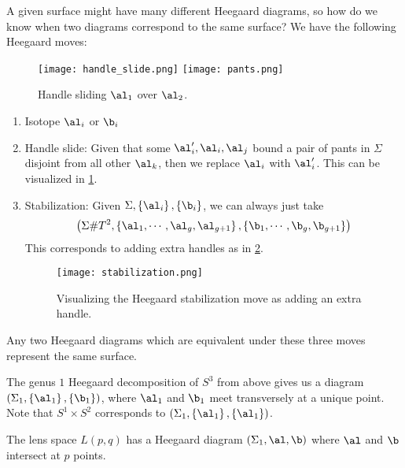 \documentclass{amsproc}
\begin{document}
A given surface might have many different Heegaard diagrams, so how do we
know when two diagrams correspond to the same surface?
We have the following Heegaard moves:
\begin{figure}
\centering
\texttt{[image: handle\_slide.png]}
\texttt{[image: pants.png]}
\caption{Handle sliding $\al_1$ over $\al_2$.}
\label{fig:handle_slide}
\end{figure}
\begin{enumerate}
\item Isotope $\al_i$ or $\b_i$
\item Handle slide: Given that some $\al_i' , \al_i , \al_j$ 
bound a pair of pants in $\Sigma$ disjoint from all
other $\al_k$, then we replace $\al_i$ with $\al_i'$.
This can be visualized in \cref{fig:handle_slide}.

\item Stabilization: 
Given $\Sigma , \left\{ \al_i \right\}, \left\{ \b_i \right\}$, 
we can always just take
\begin{equation}
\left( \Sigma \# T^2,
\left\{ \al_1 , \cdots , \al_g , \al_{g+1} \right\} , 
\left\{ \b_1 , \cdots , \b_g , \b_{g+1} \right\}\right)
\end{equation}
This corresponds to adding extra handles as in \cref{fig:stabilization}.
\begin{figure}
\texttt{[image: stabilization.png]}
\caption{Visualizing the Heegaard stabilization move as adding
an extra handle.}
\label{fig:stabilization}
\end{figure}
\end{enumerate}

\begin{thm}
Any two Heegaard diagrams which are equivalent 
under these three moves represent the same surface.
\end{thm}

\begin{exm}
The genus $1$ Heegaard decomposition of $S^3$ from above gives us a diagram
$\left( \Sigma_1 , \left\{ \al_1 \right\} , \left\{ \b_1 \right\} \right)$, 
where $\al_1$ and $\b_1$ meet transversely
at a unique point.
Note that $S^1\times S^2$ corresponds to 
$\left( \Sigma_1 , \left\{ \al_1 \right\} , \left\{ \al_1 \right\}\right)$.
\end{exm}

\begin{exm}
The lens space $L\left( p,q \right)$ has a Heegaard diagram
$\left( \Sigma_1 , \al , \b \right)$ where $\al$ and $\b$ intersect at $p$ points.
\end{exm}
\end{document}
